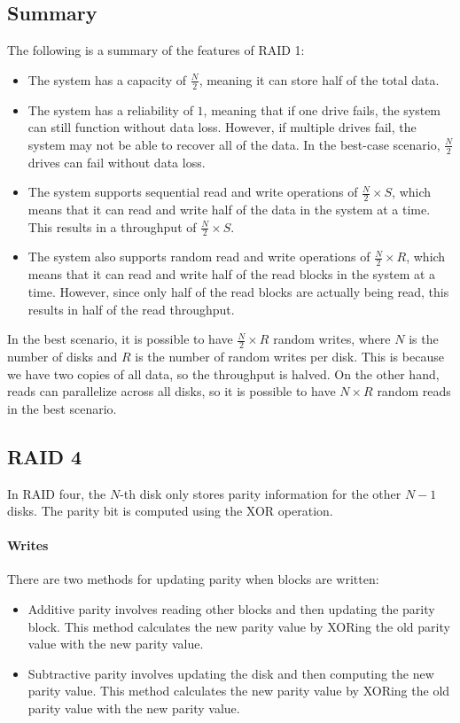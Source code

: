 \subsection{Summary}
The following is a summary of the features of RAID 1:
\begin{itemize}
    \item The system has a capacity of $\frac{N}{2}$, meaning it can store half of the total data.
    \item The system has a reliability of $1$, meaning that if one drive fails, the system can still function without data loss.
        However, if multiple drives fail, the system may not be able to recover all of the data. 
        In the best-case scenario, $\frac{N}{2}$ drives can fail without data loss.
    \item The system supports sequential read and write operations of $\frac{N}{2}\times S$, which means that it can read and write half of the data in the system at a time.
        This results in a throughput of $\frac{N}{2}\times S$.
    \item The system also supports random read and write operations of $\frac{N}{2}\times R$, which means that it can read and write half of the read blocks in the system at a time. 
        However, since only half of the read blocks are actually being read, this results in half of the read throughput.
\end{itemize}
In the best scenario, it is possible to have $\frac{N}{2} \times R$ random writes, where $N$ is the number of disks and $R$ is the number of random writes per disk. 
This is because we have two copies of all data, so the throughput is halved. 
On the other hand, reads can parallelize across all disks, so it is possible to have $N \times R$ random reads in the best scenario.

\subsection{RAID 4}

In RAID four, the $N$-th disk only stores parity information for the other $N-1$ disks. 
The parity bit is computed using the XOR operation.

\paragraph*{Writes}
There are two methods for updating parity when blocks are written:
\begin{itemize}
    \item Additive parity involves reading other blocks and then updating the parity block. 
        This method calculates the new parity value by XORing the old parity value with the new parity value.
    \item Subtractive parity involves updating the disk and then computing the new parity value. 
        This method calculates the new parity value by XORing the old parity value with the new parity value.
\end{itemize}

